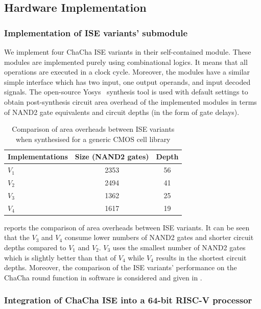 \subsection{Hardware Implementation}
\subsubsection{Implementation of ISE variants' submodule}
We implement four ChaCha ISE variants in their self-contained module. These modules are implemented purely using combinational logics. It means that all operations are executed in a clock cycle. Moreover, the modules have a similar simple interface which has two input, one output operands, and input decoded signals.
The open-source Yosys~\cite{Yosys} synthesis tool is used with default settings to obtain post-synthesis circuit area overhead of the implemented modules in terms of NAND2 gate equivalents and circuit depths (in the form of gate delays). 
 
\begin{table}
	\caption{Comparison of area overheads between ISE variants when synthesised for a
		generic CMOS cell library}
	\label{tab:res:hardcost1}
	\begin{tabular}{lcc}
		\toprule            
		Implementations        & Size (NAND2 gates)    & Depth  \\
		
		\midrule
		$V_1$ &     2353     & 56   \\
		$V_2$ &     2494     & 41   \\
		$V_3$ &     1362     & 25   \\
		$V_4$ &     1617     & 19   \\
		
		\bottomrule
	\end{tabular}
\end{table}

 reports the comparison of area overheads between ISE variants. It can be seen that the $V_3$ and $V_4$ consume lower numbers of NAND2 gates and shorter circuit depths compared to $V_1$ and $V_2$. $V_3$ uses the smallest number of NAND2 gates which is slightly better than that of $V_4$ while $V_4$ results in the shortest circuit depths. Moreover, the comparison of the ISE variants' performance on the ChaCha round function in software is considered and given in .

\subsubsection{Integration of ChaCha ISE into a 64-bit RISC-V processor}
\label{sec:ise:hw:sys}

